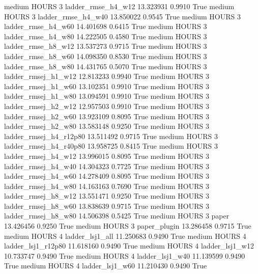     medium    HOURS                 3     ladder_rmse_h4_w12  13.323931      0.9910    True
    medium    HOURS                 3     ladder_rmse_h4_w40  13.850022      0.9545    True
    medium    HOURS                 3     ladder_rmse_h4_w60  14.401698      0.6415    True
    medium    HOURS                 3     ladder_rmse_h4_w80  14.222505      0.4580    True
    medium    HOURS                 3     ladder_rmse_h8_w12  13.537273      0.9715    True
    medium    HOURS                 3     ladder_rmse_h8_w60  14.098350      0.8530    True
    medium    HOURS                 3     ladder_rmse_h8_w80  14.431765      0.5070    True
    medium    HOURS                 3    ladder_rmsej_h1_w12  12.813233      0.9940    True
    medium    HOURS                 3    ladder_rmsej_h1_w60  13.102351      0.9910    True
    medium    HOURS                 3    ladder_rmsej_h1_w80  13.094591      0.9910    True
    medium    HOURS                 3    ladder_rmsej_h2_w12  12.957503      0.9910    True
    medium    HOURS                 3    ladder_rmsej_h2_w60  13.923109      0.8095    True
    medium    HOURS                 3    ladder_rmsej_h2_w80  13.583148      0.9250    True
    medium    HOURS                 3 ladder_rmsej_h4_r12p80  13.511492      0.9715    True
    medium    HOURS                 3 ladder_rmsej_h4_r40p80  13.958725      0.8415    True
    medium    HOURS                 3    ladder_rmsej_h4_w12  13.996015      0.8095    True
    medium    HOURS                 3    ladder_rmsej_h4_w40  14.304323      0.7725    True
    medium    HOURS                 3    ladder_rmsej_h4_w60  14.278409      0.8095    True
    medium    HOURS                 3    ladder_rmsej_h4_w80  14.163163      0.7690    True
    medium    HOURS                 3    ladder_rmsej_h8_w12  13.551471      0.9250    True
    medium    HOURS                 3    ladder_rmsej_h8_w60  13.838639      0.9715    True
    medium    HOURS                 3    ladder_rmsej_h8_w80  14.506398      0.5425    True
    medium    HOURS                 3                  paper  13.426456      0.9250    True
    medium    HOURS                 3           paper_plugin  13.286458      0.9715    True
    medium    HOURS                 4        ladder_lsj1_all  11.250683      0.9490    True
    medium    HOURS                 4     ladder_lsj1_r12p80  11.618160      0.9490    True
    medium    HOURS                 4        ladder_lsj1_w12  10.733747      0.9490    True
    medium    HOURS                 4        ladder_lsj1_w40  11.139599      0.9490    True
    medium    HOURS                 4        ladder_lsj1_w60  11.210430      0.9490    True
